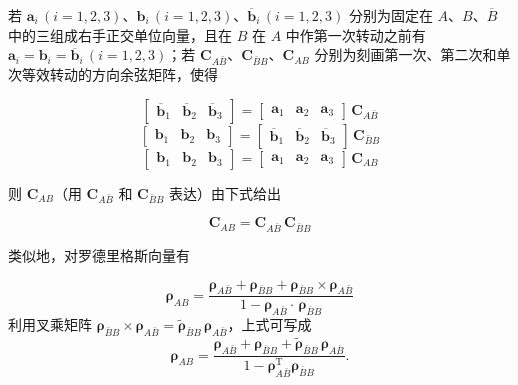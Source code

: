 若 $\mathbf{a}_i\,(i=1,2,3)$、$\mathbf{b}_i\,(i=1,2,3)$、$\overline{\mathbf{b}}_i\,(i=1,2,3)$ 分别为固定在 $A$、$B$、$\overline{B}$ 中的三组成右手正交单位向量，且在 $B$ 在 $A$ 中作第一次转动之前有 $\mathbf{a}_i=\mathbf{b}_i=\overline{\mathbf{b}}_i\,(i=1,2,3)$；若 $\bm{C}_{A\bar B}$、$\bm{C}_{\bar B B}$、$\bm{C}_{AB}$ 分别为刻画第一次、第二次和单次等效转动的方向余弦矩阵，使得

\begin{equation}\label{eq:连续转动:C_Abar_B}
\begin{bmatrix}\overline{\mathbf{b}}_1 & \overline{\mathbf{b}}_2 & \overline{\mathbf{b}}_3\end{bmatrix}
=\begin{bmatrix}\mathbf{a}_1 & \mathbf{a}_2 & \mathbf{a}_3\end{bmatrix}\,\bm{C}_{A\bar B}
\end{equation}
\begin{equation}\label{eq:连续转动:C_Bar_B_B}
\begin{bmatrix}\mathbf{b}_1 & \mathbf{b}_2 & \mathbf{b}_3\end{bmatrix}
=\begin{bmatrix}\overline{\mathbf{b}}_1 & \overline{\mathbf{b}}_2 & \overline{\mathbf{b}}_3\end{bmatrix}\,\bm{C}_{\bar B B}
\end{equation}
\begin{equation}\label{eq:连续转动:C_AB}
\begin{bmatrix}\mathbf{b}_1 & \mathbf{b}_2 & \mathbf{b}_3\end{bmatrix}
=\begin{bmatrix}\mathbf{a}_1 & \mathbf{a}_2 & \mathbf{a}_3\end{bmatrix}\,\bm{C}_{AB}
\end{equation}

则 $\bm{C}_{AB}$（用 $\bm{C}_{A\bar B}$ 和 $\bm{C}_{\bar B B}$ 表达）由下式给出

\begin{equation}\label{eq:连续转动:方向余弦乘积}
\bm{C}_{AB}=\bm{C}_{A\bar B}\,\bm{C}_{\bar B B}
\end{equation}

类似地，对罗德里格斯向量有

\begin{equation}\label{eq:连续转动:罗德里格斯乘积}
\bm{\rho}_{AB}=\frac{\bm{\rho}_{A\bar B}+\bm{\rho}_{\bar B B}+\bm{\rho}_{\bar B B}\times\bm{\rho}_{A\bar B}}{1-\bm{\rho}_{A\bar B}\cdot\,\bm{\rho}_{\bar B B}}
\end{equation}
利用叉乘矩阵 $\bm{\rho}_{\bar B B}\times\bm{\rho}_{A\bar B}=\tilde{\bm{\rho}}_{\bar B B}\,\bm{\rho}_{A\bar B}$，上式可写成
\begin{equation}
\bm{\rho}_{AB}=\frac{\bm{\rho}_{A\bar B}+\bm{\rho}_{\bar B B}+\tilde{\bm{\rho}}_{\bar B B}\,\bm{\rho}_{A\bar B}}{1-\bm{\rho}_{A\bar B}^{\mathrm{T}}\bm{\rho}_{\bar B B}}.
\label{eq:连续转动:罗德里格斯乘积矩阵}
\end{equation}

